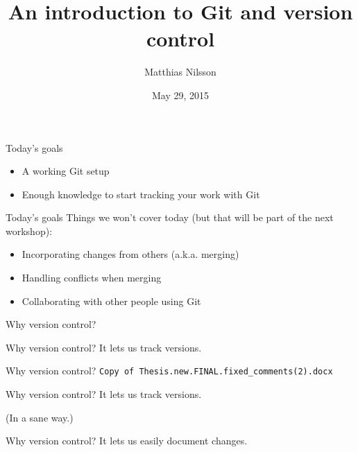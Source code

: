\documentclass{beamer}
\title{An introduction to Git and version control}
\author{Matthias Nilsson}
\institute{Chalmers University of Technology}
\date{May 29, 2015}
\begin{document}
{
\begin{frame}
\maketitle
\end{frame}
}

\begin{frame}{Today's goals}
  \begin{itemize}
  \item A working Git setup
  \item Enough knowledge to start tracking your work with Git
  \end{itemize}
\end{frame}

\begin{frame}{Today's goals}
  Things we won't cover today (but that will be part of the next workshop):

  \begin{itemize}
    \item Incorporating changes from others (a.k.a. merging)
    \item Handling conflicts when merging
    \item Collaborating with other people using Git
  \end{itemize}
\end{frame}

\begin{frame}{}
  \center
  \Huge Why version control?
\end{frame}

\begin{frame}{Why version control?}
  \center
  \Huge It lets us track versions.
\end{frame}

\begin{frame}[fragile]{Why version control?}
  \center
  \large \texttt{Copy of Thesis.new.FINAL.fixed_comments(2).docx}
\end{frame}

\begin{frame}{Why version control?}
  \center
  \Huge It lets us track versions.

  \huge (In a sane way.)
\end{frame}

\begin{frame}{Why version control?}
  \center
  \Huge It lets us easily document changes.
\end{frame}
\end{document}

